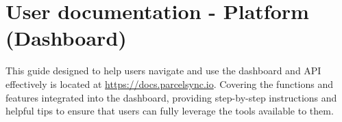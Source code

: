 \chapter{User documentation - Platform (Dashboard)}
This guide designed to help users navigate and use the dashboard and API effectively is located at \url{https://docs.parcelsync.io}.
Covering the functions and features integrated into the dashboard, providing step-by-step instructions and helpful tips to ensure that users can fully leverage the tools available to them. 
